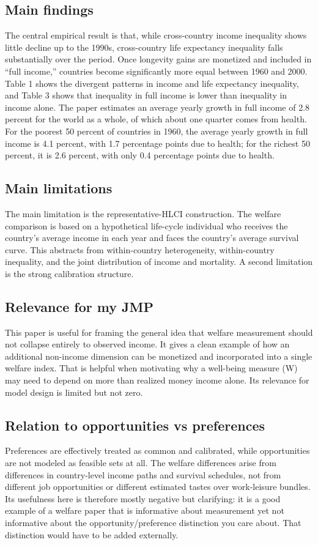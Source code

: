 \documentclass[11pt,a4paper]{article}
\begin{document}
\subsection*{Main findings}
The central empirical result is that, while cross-country income inequality shows little decline up to the 1990s, cross-country life expectancy inequality falls substantially over the period. Once longevity gains are monetized and included in “full income,” countries become significantly more equal between 1960 and 2000. Table 1 shows the divergent patterns in income and life expectancy inequality, and Table 3 shows that inequality in full income is lower than inequality in income alone. The paper estimates an average yearly growth in full income of 2.8 percent for the world as a whole, of which about one quarter comes from health. For the poorest 50 percent of countries in 1960, the average yearly growth in full income is 4.1 percent, with 1.7 percentage points due to health; for the richest 50 percent, it is 2.6 percent, with only 0.4 percentage points due to health.

\subsection*{Main limitations}
The main limitation is the representative-HLCI construction. The welfare comparison is based on a hypothetical life-cycle individual who receives the country’s average income in each year and faces the country’s average survival curve. This abstracts from within-country heterogeneity, within-country inequality, and the joint distribution of income and mortality. A second limitation is the strong calibration structure.

\subsection*{Relevance for my JMP}
This paper is useful for framing the general idea that welfare measurement should not collapse entirely to observed income. It gives a clean example of how an additional non-income dimension can be monetized and incorporated into a single welfare index. That is helpful when motivating why a well-being measure (W) may need to depend on more than realized money income alone. Its relevance for model design is limited but not zero.

\subsection*{Relation to opportunities vs preferences}
Preferences are effectively treated as common and calibrated, while opportunities are not modeled as feasible sets at all. The welfare differences arise from differences in country-level income paths and survival schedules, not from different job opportunities or different estimated tastes over work-leisure bundles. Its usefulness here is therefore mostly negative but clarifying: it is a good example of a welfare paper that is informative about measurement yet not informative about the opportunity/preference distinction you care about. That distinction would have to be added externally.
\end{document}
